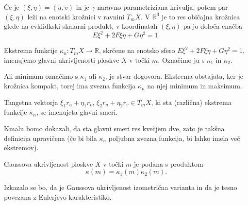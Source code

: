 \begin{opomba}
 Če je $(\xi, \eta) = (\dot{u}, \dot{v})$ in je $\gamma$ naravno parametriziana krivulja, potem par $(\xi, \eta)$ leži
 na enotski krožnici v ravnini $T_mX$. V $\mathbb{R}^3$ je to res običajna krožnica glede na
 evklidkski skalarni produkt, v koordinatah $(\xi, \eta)$ pa jo določa enačba 
 \begin{equation*} E \xi^2 + 2F \xi \eta + G \eta^2  = 1.\end{equation*}
\end{opomba}

\begin{definicija}
\label{def_glavni_ukrivljenosti_ploskve}
 Ekstrema funkcije $\kappa_n: T_mX \to  \mathbb{R}$, skrčene na enotsko sfero $E \xi^2 + 2F \xi \eta + G \eta^2  = 1$, imenujemo glavni ukrivljenosti ploskve $X$ v točki $m$. 
 Označimo ju s $\kappa_1$ in $\kappa_2$. 
\end{definicija}

\begin{opomba}
 Ali minimum označimo s $\kappa_1$ ali $\kappa_2$, je stvar dogovora. Ekstrema obstajata, ker je krožnica kompakt, torej ima zvezna funkcija $\kappa_n$ na njej minimum in maksimum.
\end{opomba}

\begin{definicija}
\label{def_glavni_smeri}
 Tangetna vektorja $\xi_1 r_u  + \eta_1 r_v$, $\xi_2 r_u  + \eta_2 r_v \in T_mX$, ki sta (različna) ekstrema funkcije $\kappa_n$, se imenujeta glavni smeri.
\end{definicija}

\begin{opomba}
 Kmalu bomo dokazali, da sta glavni smeri res kvečjem dve, zato je takšna definicija upravičena (če bi bila $\kappa_n$ poljubna zvezna funkcija, bi lahko imela več ekstremov).
\end{opomba}

\begin{definicija}
\label{def_Gaussova_ukrivljenost}
 Gaussova ukrivljenost ploskve $X$ v točki $m$ je podana s produktom 
 \begin{equation*} \kappa(m) = \kappa_1(m) \kappa_2(m).\end{equation*}
\end{definicija}

\begin{opomba}
 Izkazalo se bo, da je Gaussova ukrivljenost izometrična varianta in da je tesno povezana z Eulerjevo karakteristiko.
\end{opomba}


